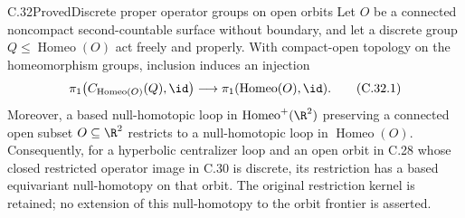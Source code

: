 \begin{claim}{C.32}{Proved}{Discrete proper operator groups on open orbits}
Let $O$ be a connected noncompact second-countable surface without
boundary, and let a discrete group $Q\leq\operatorname{Homeo}(O)$ act
freely and properly. With compact-open topology on the homeomorphism
groups, inclusion induces an injection
\[
 \pi_1\!\left(C_{\operatorname{Homeo}(O)}(Q),\id\right)
       \longrightarrow \pi_1(\operatorname{Homeo}(O),\id).
                                                        \tag{C.32.1}
\]
Moreover, a based null-homotopic loop in
$\operatorname{Homeo}^+(\R^2)$ preserving a connected open subset
$O\subseteq\R^2$ restricts to a null-homotopic loop in
$\operatorname{Homeo}(O)$.
Consequently, for a hyperbolic centralizer loop and an open orbit in
C.28 whose closed restricted operator image in C.30 is discrete, its
restriction has a based equivariant null-homotopy on that orbit.
The original restriction kernel is retained; no extension of this
null-homotopy to the orbit frontier is asserted.
\end{claim}
